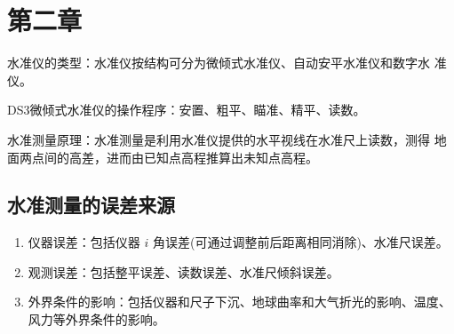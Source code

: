 \documentclass[12pt,a4paper]{article}
\begin{document}
\section*{第二章}

水准仪的类型：水准仪按结构可分为{\color{red}微倾式水准仪、自动安平水准仪和数字水
准仪}。

DS3微倾式水准仪的操作程序：安置、粗平、瞄准、精平、读数。 

水准测量原理：水准测量是利用水准仪提供的水平视线在水准尺上读数，测得
地面两点间的高差，进而由已知点高程推算出未知点高程。

\subsection*{水准测量的误差来源}
\begin{enumerate}
    \item 仪器误差：包括仪器 $i$ 角误差(可通过调整前后距离相同消除)、水准尺误差。
    \item 观测误差：包括整平误差、读数误差、水准尺倾斜误差。
    \item 外界条件的影响：包括仪器和尺子下沉、地球曲率和大气折光的影响、温度、风力等外界条件的影响。
\end{enumerate} 
\newpage
\end{document}
